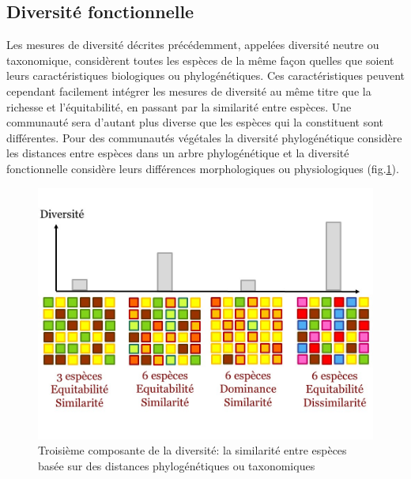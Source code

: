 \documentclass[
  11pt,
  french,
  A4paper,
  extrafontsizes,onecolumn,openright
  ]{memoir}
\begin{document}
\subsection{Diversité fonctionnelle}\label{diversite-fonctionnelle}

Les mesures de diversité décrites précédemment, appelées diversité
neutre ou taxonomique, considèrent toutes les espèces de la même façon
quelles que soient leurs caractéristiques biologiques ou
phylogénétiques. Ces caractéristiques peuvent cependant facilement
intégrer les mesures de diversité au même titre que la richesse et
l'équitabilité, en passant par la similarité entre espèces. Une
communauté sera d'autant plus diverse que les espèces qui la constituent
sont différentes. Pour des communautés végétales la diversité
phylogénétique considère les distances entre espèces dans un arbre
phylogénétique et la diversité fonctionnelle considère leurs différences
morphologiques ou physiologiques (fig.\ref{fig:RichEquSim}).

\begin{figure}

{\centering \includegraphics[width=0.6\linewidth]{ExternalFig/Fig_RichnessEquitabilitySimilarity} 

}

\caption{Troisième composante de la diversité: la similarité entre espèces basée sur des distances phylogénétiques ou taxonomiques}\label{fig:RichEquSim}
\end{figure}
\end{document}
